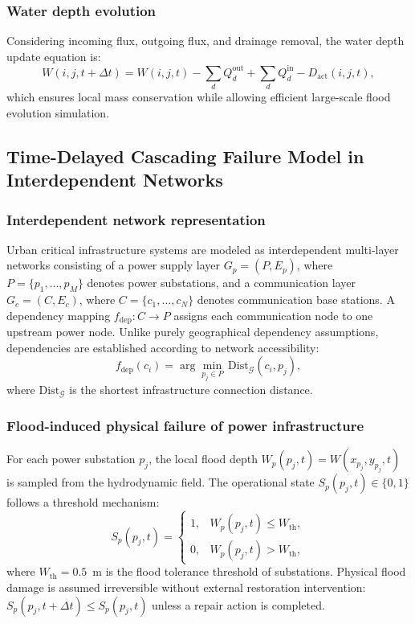 \documentclass[preprint,12pt]{elsarticle}
\begin{document}
\subsubsection{Water depth evolution}
Considering incoming flux, outgoing flux, and drainage removal, the water
depth update equation is:
\begin{equation}\label{eq:update}
W(i,j,t+\Delta t) = W(i,j,t) - \sum_{d} Q_d^{\mathrm{out}} +
\sum_{d} Q_d^{\mathrm{in}} - D_{\mathrm{act}}(i,j,t),
\end{equation}
which ensures local mass conservation while allowing efficient large-scale
flood evolution simulation.

\subsection{Time-Delayed Cascading Failure Model in Interdependent Networks}
\subsubsection{Interdependent network representation}
Urban critical infrastructure systems are modeled as interdependent
multi-layer networks consisting of a power supply layer $G_p = (P, E_p)$,
where $P = \{p_1,\dots,p_M\}$ denotes power substations, and a communication
layer $G_c = (C, E_c)$, where $C = \{c_1,\dots,c_N\}$ denotes communication
base stations. A dependency mapping $f_{\mathrm{dep}}: C \rightarrow P$
assigns each communication node to one upstream power node. Unlike purely
geographical dependency assumptions, dependencies are established according
to network accessibility:
\begin{equation}\label{eq:dep}
f_{\mathrm{dep}}(c_i) = \arg\min_{p_j \in P}\,
\mathrm{Dist}_{\mathcal{G}}(c_i, p_j),
\end{equation}
where $\mathrm{Dist}_{\mathcal{G}}$ is the shortest infrastructure
connection distance.

\subsubsection{Flood-induced physical failure of power infrastructure}
For each power substation $p_j$, the local flood depth
$W_p(p_j,t) = W(x_{p_j}, y_{p_j}, t)$ is sampled from the hydrodynamic field.
The operational state $S_p(p_j,t)\in\{0,1\}$ follows a threshold mechanism:
\begin{equation}\label{eq:pfail}
S_p(p_j,t) =
\begin{cases}
1, & W_p(p_j,t) \le W_{\mathrm{th}},\\
0, & W_p(p_j,t) > W_{\mathrm{th}},
\end{cases}
\end{equation}
where $W_{\mathrm{th}} = 0.5$~m is the flood tolerance threshold of
substations. Physical flood damage is assumed irreversible without external
restoration intervention: $S_p(p_j,t+\Delta t) \le S_p(p_j,t)$ unless a
repair action is completed.
\end{document}
